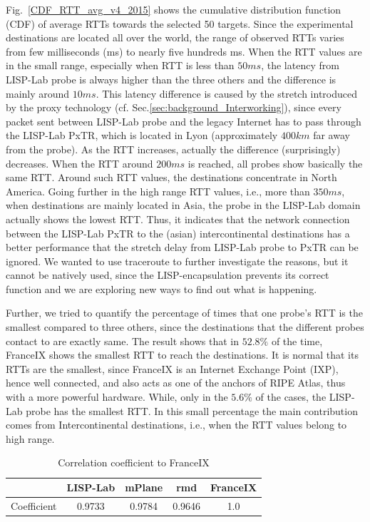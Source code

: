 Fig.~\ref{CDF_RTT_avg_v4_2015} shows the cumulative distribution function (CDF) of average RTTs towards the selected 50 targets. Since the experimental destinations are located all over the world, the range of observed RTTs varies from few milliseconds (ms) to nearly five hundreds ms. When the RTT values are in the small range, especially when RTT is less than $50ms$, the latency from LISP-Lab probe is always higher than the three others and the difference is mainly around $10ms$. This latency difference is caused by the stretch introduced by the proxy technology (cf. Sec.\ref{sec:background_Interworking}), since every packet sent between LISP-Lab probe and the legacy Internet has to pass through the LISP-Lab PxTR, which is located in Lyon (approximately $400km$ far away from the probe). As the RTT increases, actually the difference (surprisingly) decreases. When the RTT around $200ms$ is reached, all probes show basically the same RTT. Around such RTT values, the destinations concentrate in North America. Going further in the high range RTT values, i.e., more than $350ms$, when destinations are mainly located in Asia, the probe in the LISP-Lab domain actually shows the lowest RTT. Thus, it indicates that the network connection between the LISP-Lab PxTR to the (asian) intercontinental destinations has a better performance that the stretch delay from LISP-Lab probe to PxTR can be ignored. We wanted to use traceroute to further investigate the reasons, but it cannot be natively used, since the LISP-encapsulation prevents its correct function and we are exploring new ways to find out what is happening. 
    
Further, we tried to quantify the percentage of times that one probe's RTT is the smallest compared to three others, since the destinations that the different probes contact to are exactly same. The result shows that in $52.8\%$ of the time, FranceIX shows the smallest RTT to reach the destinations. It is normal that its RTTs are the smallest, since FranceIX is an Internet Exchange Point (IXP), hence well connected, and also acts as one of the anchors of RIPE Atlas, thus with a more powerful hardware. While, only in the $5.6\%$ of the cases, the LISP-Lab probe has the smallest RTT. In this small percentage the main contribution comes from Intercontinental destinations, i.e., when the RTT values belong to high range.
    
\begin{table}[!tb]
    \centering
    \caption{Correlation coefficient to FranceIX}
    \label{correlation_v4_2015}{
        \begin{tabular}{@{}c|c|c|c|c@{}}
    		\hline\hline
    		& LISP-Lab  & mPlane &  rmd &  FranceIX \\ \hline
    		Coefficient & 0.9733  & 0.9784 &  0.9646  &  1.0     	\\  \hline\hline                 
    	\end{tabular}
    }
\end{table}
    

